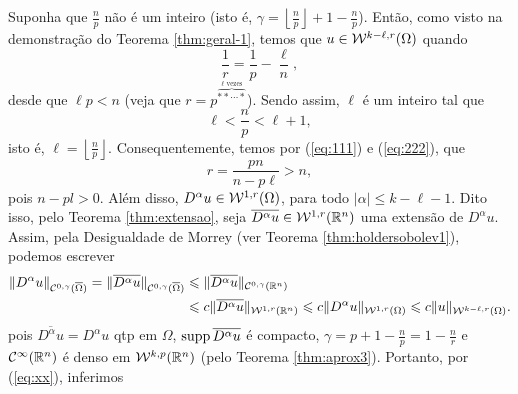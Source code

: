 \begin{prf}
    Suponha que $\frac{n}{p}$ não é um inteiro (isto é, $\gamma = \left\lfloor \frac{n}{p} \right\rfloor + 1 - \frac{n}{p}$). Então, como visto na demonstração do Teorema \ref{thm:geral-1}, temos que $u \in \mathcal{W}^{k-\ell,r}(\Omega)$ quando
    \begin{equation} \label{eq:111}
        \frac{1}{r} = \frac{1}{p} - \frac{\ell}{n},
    \end{equation}
    desde que $\ell p < n$ (veja que $r = p^{\overbrace{**\cdots*}^{\ell \text{ vezes}}}$). Sendo assim, $\ell$ é um inteiro tal que
    \begin{equation} \label{eq:222}
        \ell < \frac{n}{p} < \ell + 1,
    \end{equation}
    isto é, $\ell = \left\lfloor \frac{n}{p} \right\rfloor$.
    Consequentemente, temos por (\ref{eq:111}) e (\ref{eq:222}), que
    \begin{equation}
        r = \frac{pn}{n-p\ell} > n,
    \end{equation}
    pois $n - pl > 0$. Além disso, $D^\alpha u \in \mathcal{W}^{1,r}(\Omega)$, para todo $|\alpha| \leqslant k - \ell -1$. Dito isso, pelo Teorema \ref{thm:extensao}, seja $\overline{D^\alpha u} \in \mathcal{W}^{1,r}(\mathbb{R}^n)$ uma extensão de $D^\alpha u$.
    Assim, pela Desigualdade de Morrey (ver Teorema \ref{thm:holdersobolev1}), podemos escrever
    \begin{equation} \label{eq:xx}
        \begin{aligned}
            \Vert D^\alpha u \Vert_{\mathcal{C}^{0,\gamma}(\overline\Omega)} = \Vert \overline{D^\alpha u} \Vert_{\mathcal{C}^{0,\gamma}(\overline\Omega)} &\leqslant \Vert \overline{D^\alpha u} \Vert_{\mathcal{C}^{0,\gamma}(\mathbb{R}^n)} \\
            &\leqslant c \Vert \overline{D^\alpha u} \Vert_{\mathcal{W}^{1,r}(\mathbb{R}^n)}\leqslant c \Vert D^\alpha u \Vert_{\mathcal{W}^{1,r}(\Omega)} \leqslant c \Vert u \Vert_{\mathcal{W}^{k-\ell,r}(\Omega)}.
        \end{aligned}
    \end{equation}
    pois $\overline{D^\alpha u} = D^\alpha u$ qtp em $\Omega$, $\mathrm{supp}\, \overline{D^\alpha u}$ é compacto, $\gamma = p + 1 - \frac{n}{p} = 1 - \frac{n}{r}$ e $\mathcal{C}^\infty(\mathbb{R}^n)$ é denso em $\mathcal{W}^{k,p}(\mathbb{R}^n)$ (pelo Teorema \ref{thm:aprox3}).
    Portanto, por (\ref{eq:xx}), inferimos
    \[
        \begin{aligned}

\end{aligned}\]
\end{prf}
